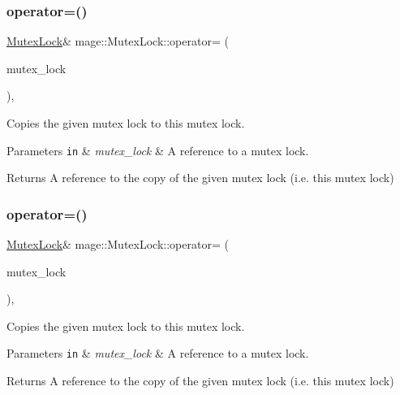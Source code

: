 \subsubsection{\texorpdfstring{operator=()}{operator=()}\hspace{0.1cm}{\footnotesize\ttfamily [1/2]}}
{\footnotesize\ttfamily \hyperlink{structmage_1_1_mutex_lock}{Mutex\+Lock}\& mage\+::\+Mutex\+Lock\+::operator= (\begin{DoxyParamCaption}\item[{const \hyperlink{structmage_1_1_mutex_lock}{Mutex\+Lock} \&}]{mutex\+\_\+lock }\end{DoxyParamCaption})\hspace{0.3cm}{\ttfamily [private]}, {\ttfamily [delete]}}

Copies the given mutex lock to this mutex lock.


\begin{DoxyParams}[1]{Parameters}
\mbox{\tt in}  & {\em mutex\+\_\+lock} & A reference to a mutex lock. \\
\hline
\end{DoxyParams}
\begin{DoxyReturn}{Returns}
A reference to the copy of the given mutex lock (i.\+e. this mutex lock) 
\end{DoxyReturn}
\hypertarget{structmage_1_1_mutex_lock_a189a5b4efe2831352b13bd30b80ea47d}{}\label{structmage_1_1_mutex_lock_a189a5b4efe2831352b13bd30b80ea47d} 
\subsubsection{\texorpdfstring{operator=()}{operator=()}\hspace{0.1cm}{\footnotesize\ttfamily [2/2]}}
{\footnotesize\ttfamily \hyperlink{structmage_1_1_mutex_lock}{Mutex\+Lock}\& mage\+::\+Mutex\+Lock\+::operator= (\begin{DoxyParamCaption}\item[{\hyperlink{structmage_1_1_mutex_lock}{Mutex\+Lock} \&\&}]{mutex\+\_\+lock }\end{DoxyParamCaption})\hspace{0.3cm}{\ttfamily [private]}, {\ttfamily [delete]}}

Copies the given mutex lock to this mutex lock.


\begin{DoxyParams}[1]{Parameters}
\mbox{\tt in}  & {\em mutex\+\_\+lock} & A reference to a mutex lock. \\
\hline
\end{DoxyParams}
\begin{DoxyReturn}{Returns}
A reference to the copy of the given mutex lock (i.\+e. this mutex lock) 
\end{DoxyReturn}


